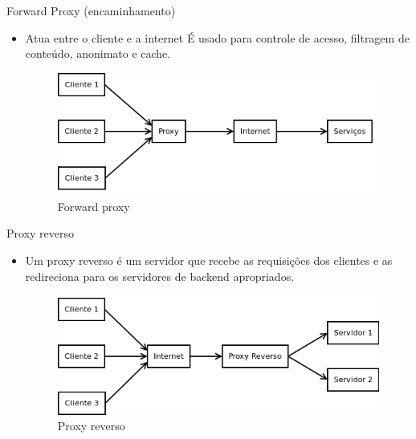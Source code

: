 \begin{frame}[fragile]{Forward Proxy (encaminhamento)}
    \begin{itemize}%
        \item Atua entre o cliente e a internet É usado para controle de acesso, filtragem de conteúdo, anonimato e cache.\newline
        
        \begin{figure}
            \centering
            \includegraphics[width=0.7\linewidth]{contents//img/1.png}
            \caption{Forward proxy}
            \label{fig:enter-label}
        \end{figure}

    \end{itemize}
\end{frame}

\begin{frame}[fragile]{Proxy reverso}
    \begin{itemize}%
        \item Um proxy reverso é um servidor que recebe as requisições dos clientes e as redireciona para os servidores de backend apropriados. \newline
        
        \begin{figure}
            \centering
            \includegraphics[width=0.7\linewidth]{contents//img/2.png}
            \caption{Proxy reverso}
            \label{fig:enter-label}
        \end{figure}
    \end{itemize}
\end{frame}